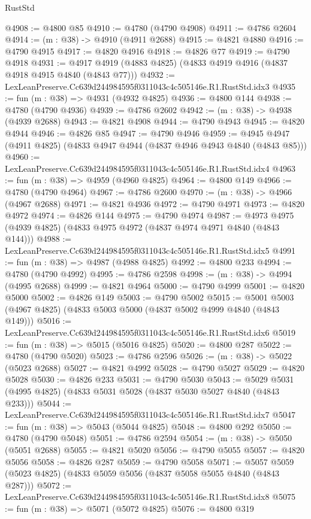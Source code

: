 \begin{lexlean}{RustStd}
\begin{coremodule}
@4908 := @4800 @85
@4910 := @4780 (@4790 @4908)
@4911 := @4786 @2604
@4914 := (m : @38) -> @4910 (@4911 @2688)
@4915 := @4821 @4880
@4916 := @4790 @4915
@4917 := @4820 @4916
@4918 := @4826 @77
@4919 := @4790 @4918
@4931 := @4917 @4919 (@4883 @4825) (@4833 @4919 @4916 (@4837 @4918 @4915 @4840 (@4843 @77)))
@4932 := LexLeanPreserve.Cc639d244984595f0311043c4c505146e.R1.RustStd.idx3
@4935 := fun (m : @38) => @4931 (@4932 @4825)
@4936 := @4800 @144
@4938 := @4780 (@4790 @4936)
@4939 := @4786 @2602
@4942 := (m : @38) -> @4938 (@4939 @2688)
@4943 := @4821 @4908
@4944 := @4790 @4943
@4945 := @4820 @4944
@4946 := @4826 @85
@4947 := @4790 @4946
@4959 := @4945 @4947 (@4911 @4825) (@4833 @4947 @4944 (@4837 @4946 @4943 @4840 (@4843 @85)))
@4960 := LexLeanPreserve.Cc639d244984595f0311043c4c505146e.R1.RustStd.idx4
@4963 := fun (m : @38) => @4959 (@4960 @4825)
@4964 := @4800 @149
@4966 := @4780 (@4790 @4964)
@4967 := @4786 @2600
@4970 := (m : @38) -> @4966 (@4967 @2688)
@4971 := @4821 @4936
@4972 := @4790 @4971
@4973 := @4820 @4972
@4974 := @4826 @144
@4975 := @4790 @4974
@4987 := @4973 @4975 (@4939 @4825) (@4833 @4975 @4972 (@4837 @4974 @4971 @4840 (@4843 @144)))
@4988 := LexLeanPreserve.Cc639d244984595f0311043c4c505146e.R1.RustStd.idx5
@4991 := fun (m : @38) => @4987 (@4988 @4825)
@4992 := @4800 @233
@4994 := @4780 (@4790 @4992)
@4995 := @4786 @2598
@4998 := (m : @38) -> @4994 (@4995 @2688)
@4999 := @4821 @4964
@5000 := @4790 @4999
@5001 := @4820 @5000
@5002 := @4826 @149
@5003 := @4790 @5002
@5015 := @5001 @5003 (@4967 @4825) (@4833 @5003 @5000 (@4837 @5002 @4999 @4840 (@4843 @149)))
@5016 := LexLeanPreserve.Cc639d244984595f0311043c4c505146e.R1.RustStd.idx6
@5019 := fun (m : @38) => @5015 (@5016 @4825)
@5020 := @4800 @287
@5022 := @4780 (@4790 @5020)
@5023 := @4786 @2596
@5026 := (m : @38) -> @5022 (@5023 @2688)
@5027 := @4821 @4992
@5028 := @4790 @5027
@5029 := @4820 @5028
@5030 := @4826 @233
@5031 := @4790 @5030
@5043 := @5029 @5031 (@4995 @4825) (@4833 @5031 @5028 (@4837 @5030 @5027 @4840 (@4843 @233)))
@5044 := LexLeanPreserve.Cc639d244984595f0311043c4c505146e.R1.RustStd.idx7
@5047 := fun (m : @38) => @5043 (@5044 @4825)
@5048 := @4800 @292
@5050 := @4780 (@4790 @5048)
@5051 := @4786 @2594
@5054 := (m : @38) -> @5050 (@5051 @2688)
@5055 := @4821 @5020
@5056 := @4790 @5055
@5057 := @4820 @5056
@5058 := @4826 @287
@5059 := @4790 @5058
@5071 := @5057 @5059 (@5023 @4825) (@4833 @5059 @5056 (@4837 @5058 @5055 @4840 (@4843 @287)))
@5072 := LexLeanPreserve.Cc639d244984595f0311043c4c505146e.R1.RustStd.idx8
@5075 := fun (m : @38) => @5071 (@5072 @4825)
@5076 := @4800 @319

\end{coremodule}
\end{lexlean}
